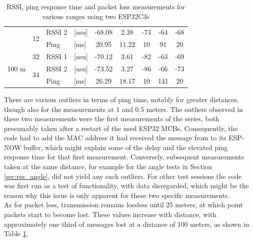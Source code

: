 \begin{table}[H]
\begin{tabular}{|c|c|l|l|c|c|c|c|c|}
        & \multirow{2}{*}{12} & RSSI 2 & [asu] & -68.08 & 2.38 & -74 & -64 & -68 \\\cline{3-9}
        && Ping & [ms] & 20.95 & 11.22 & 10 & 91 & 20 \\\hline\hline
        \multirow{3}{*}{100 m} & \multirow{1}{*}{32} & RSSI 1 & [asu] & -70.12 & 3.61 & -82 & -63 & -69 \\\cline{2-9}\cline{2-9}
        & \multirow{2}{*}{34} & RSSI 2 & [asu] & -73.52 & 3.27 & -86 & -66 & -73 \\\cline{3-9}
        && Ping & [ms] & 26.29 & 18.17 & 10 & 141 & 20 \\\hline
    \end{tabular}
    \vspace{\ftspace}
    \caption{RSSI, ping response time and packet loss measurements for various ranges using two ESP32C3s}
    \label{tab:rssipingrange_esp32c3}
\end{table}
\newpage

There are various outliers in terms of ping time, notably for greater distances, though also for the measurements at 1 and 0.5 meters. The outliers observed in these two measurements were the first measurements of the series, both presumably taken after a restart of the used ESP32 MCBs. Consequently, the code had to add the MAC address it had received the message from to its ESP-NOW buffer, which might explain some of the delay and the elevated ping response time for that first measurement. Conversely, subsequent measurements taken at the same distance, for example for the angle tests in Section \ref{sec:res_angle}, did not yield any such outliers. For other test sessions the code was first run as a test of functionality, with data disregarded, which might be the reason why this issue is only apparent for these two specific measurements.\\

As for packet loss, transmission remains lossless until 25 meters, at which point packets start to become lost. These values increase with distance, with approximately one third of messages lost at a distance of 100 meters, as shown in Table \ref{tab:rssipingrange_esp32c3}.

